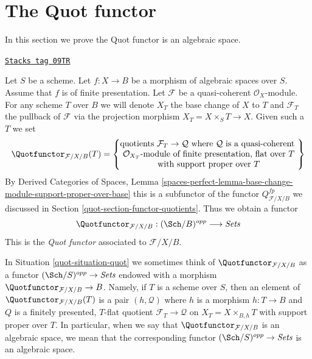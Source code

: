 \section{The Quot functor}
\label{quot-section-quot}
In this section we prove the Quot functor is an algebraic space.

\begin{definition}
\label{quot-situation-quot}
\href{https://stacks.math.columbia.edu/tag/09TR}{\texttt{Stacks tag 09TR}}

Let $S$ be a scheme. Let $f : X \to B$ be a morphism of
algebraic spaces over $S$. Assume that $f$ is of finite presentation.
Let $\mathcal{F}$ be a quasi-coherent $\mathcal{O}_X$-module.
For any scheme $T$ over $B$ we will denote $X_T$ the base change of
$X$ to $T$ and $\mathcal{F}_T$ the pullback
of $\mathcal{F}$ via the projection morphism $X_T = X \times_S T \to X$.
Given such a $T$ we set
$$
\Quotfunctor_{\mathcal{F}/X/B}(T) =
\left\{
\begin{matrix}
\text{quotients }\mathcal{F}_T \to \mathcal{Q}\text{ where }
\mathcal{Q}\text{ is a quasi-coherent }\\
\mathcal{O}_{X_T}\text{-module of finite presentation, flat over }T\\
\text{with support proper over }T
\end{matrix}
\right\}
$$
By Derived Categories of Spaces, Lemma
\ref{spaces-perfect-lemma-base-change-module-support-proper-over-base}
this is a subfunctor of the functor $Q^{fp}_{\mathcal{F}/X/B}$
we discussed in Section \ref{quot-section-functor-quotients}.
Thus we obtain a functor
\begin{equation}
\label{equation-quot}
\Quotfunctor_{\mathcal{F}/X/B} : (\Sch/B)^{opp} \longrightarrow \textit{Sets}
\end{equation}
This is the {\it Quot functor} associated to $\mathcal{F}/X/B$.
\end{definition}

In Situation \ref{quot-situation-quot} we sometimes think of
$\Quotfunctor_{\mathcal{F}/X/B}$ as a functor
$(\Sch/S)^{opp} \to \textit{Sets}$ endowed
with a morphism $\Quotfunctor_{\mathcal{F}/X/B} \to B$.
Namely, if $T$ is a scheme over $S$, then an element
of $\Quotfunctor_{\mathcal{F}/X/B}(T)$ is a pair $(h, \mathcal{Q})$
where $h$ is a morphism $h : T \to B$
and $Q$ is a finitely presented, $T$-flat quotient
$\mathcal{F}_T \to \mathcal{Q}$ on $X_T = X \times_{B, h} T$
with support proper over $T$. In particular, when we say
that $\Quotfunctor_{\mathcal{F}/X/B}$ is an algebraic space, we mean that the
corresponding functor $(\Sch/S)^{opp} \to \textit{Sets}$ is an algebraic space.

